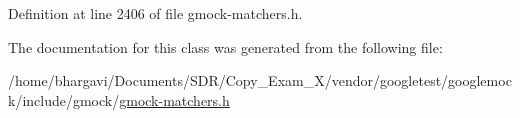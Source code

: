 Definition at line 2406 of file gmock-\/matchers.\+h.



The documentation for this class was generated from the following file\+:\begin{DoxyCompactItemize}
\item 
/home/bhargavi/\+Documents/\+S\+D\+R/\+Copy\+\_\+\+Exam\+\_\+X/vendor/googletest/googlemock/include/gmock/\hyperlink{gmock-matchers_8h}{gmock-\/matchers.\+h}\end{DoxyCompactItemize}
